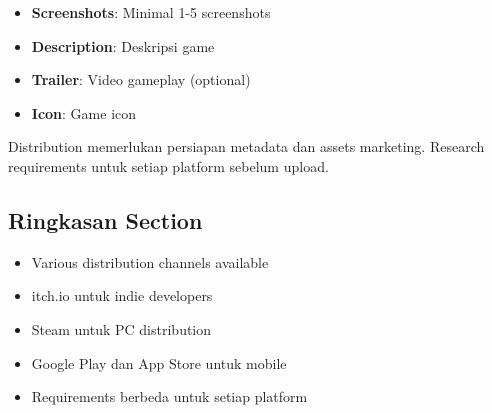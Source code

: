 \begin{itemize}
\item \textbf{Screenshots}: Minimal 1-5 screenshots
\item \textbf{Description}: Deskripsi game
\item \textbf{Trailer}: Video gameplay (optional)
\item \textbf{Icon}: Game icon
\end{itemize}

\begin{catatan}
Distribution memerlukan persiapan metadata dan assets marketing. Research requirements untuk setiap platform sebelum upload.
\end{catatan}

\subsection{Ringkasan Section}

\begin{itemize}
\item Various distribution channels available
\item itch.io untuk indie developers
\item Steam untuk PC distribution
\item Google Play dan App Store untuk mobile
\item Requirements berbeda untuk setiap platform
\end{itemize}
